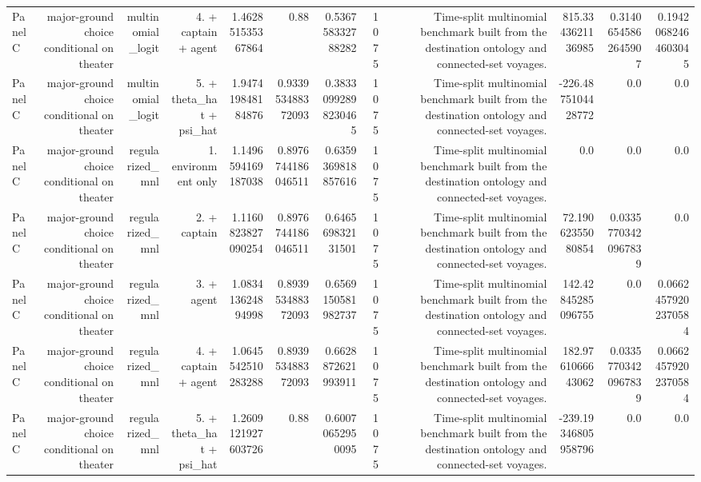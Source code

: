 \documentclass{article}
\begin{document}
\begin{tabular}{lrrrrrrrrrrr}
Panel C & major-ground choice conditional on theater & multinomial\_logit & 4. + captain + agent & 1.462851535367864 & 0.88 & 0.536758332788282 & 1075 & Time-split multinomial benchmark built from the destination ontology and connected-set voyages. & 815.3343621136985 & 0.31406545862645907 & 0.19420682464603045 \\
Panel C & major-ground choice conditional on theater & multinomial\_logit & 5. + theta\_hat + psi\_hat & 1.947419848184876 & 0.933953488372093 & 0.38330992898230465 & 1075 & Time-split multinomial benchmark built from the destination ontology and connected-set voyages. & -226.4875104428772 & 0.0 & 0.0 \\
Panel C & major-ground choice conditional on theater & regularized\_mnl & 1. environment only & 1.1496594169187038 & 0.8976744186046511 & 0.6359369818857616 & 1075 & Time-split multinomial benchmark built from the destination ontology and connected-set voyages. & 0.0 & 0.0 & 0.0 \\
Panel C & major-ground choice conditional on theater & regularized\_mnl & 2. + captain & 1.1160823827090254 & 0.8976744186046511 & 0.646569832131501 & 1075 & Time-split multinomial benchmark built from the destination ontology and connected-set voyages. & 72.19062355080854 & 0.03357703420967839 & 0.0 \\
Panel C & major-ground choice conditional on theater & regularized\_mnl & 3. + agent & 1.083413624894998 & 0.893953488372093 & 0.6569150581982737 & 1075 & Time-split multinomial benchmark built from the destination ontology and connected-set voyages. & 142.42845285096755 & 0.0 & 0.06624579202370584 \\
Panel C & major-ground choice conditional on theater & regularized\_mnl & 4. + captain + agent & 1.0645542510283288 & 0.893953488372093 & 0.6628872621993911 & 1075 & Time-split multinomial benchmark built from the destination ontology and connected-set voyages. & 182.9761066643062 & 0.03357703420967839 & 0.06624579202370584 \\
Panel C & major-ground choice conditional on theater & regularized\_mnl & 5. + theta\_hat + psi\_hat & 1.2609121927603726 & 0.88 & 0.60070652950095 & 1075 & Time-split multinomial benchmark built from the destination ontology and connected-set voyages. & -239.19346805958796 & 0.0 & 0.0 \\
\hline
\end{tabular}
\end{document}
